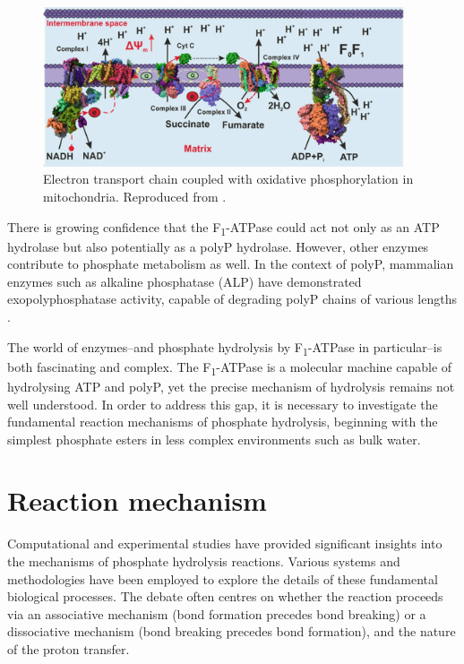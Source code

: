 \begin{figure}[t!]
    \centering
    \includegraphics[width=0.95\textwidth]{Figures/1_Introduction/intro_atp_synthase.pdf}
    \caption{Electron transport chain coupled with oxidative phosphorylation in mitochondria. Reproduced from \citep{baevInorganicPolyphosphateF0F1ATP2022}.}
    \label{fig:atp_synthase}
\end{figure}

There is growing confidence that the F\textsubscript{1}-ATPase could act not only as an ATP hydrolase but also potentially as a polyP hydrolase. However, other enzymes contribute to phosphate metabolism as well. In the context of polyP, mammalian enzymes such as alkaline phosphatase (ALP) have demonstrated exopolyphosphatase activity, capable of degrading polyP chains of various lengths \citep{baevInorganicPolyphosphateF0F1ATP2022}.

The world of enzymes--and phosphate hydrolysis by F\textsubscript{1}-ATPase in particular--is both fascinating and complex. The F\textsubscript{1}-ATPase is a molecular machine capable of hydrolysing ATP and polyP, yet the precise mechanism of hydrolysis remains not well understood. In order to address this gap, it is necessary to investigate the fundamental reaction mechanisms of phosphate hydrolysis, beginning with the simplest phosphate esters in less complex environments such as bulk water.



\section{Reaction mechanism}
Computational and experimental studies have provided significant insights into the mechanisms of phosphate hydrolysis reactions. Various systems and methodologies have been employed to explore the details of these fundamental biological processes. The debate often centres on whether the reaction proceeds via an associative mechanism (bond formation precedes bond breaking) or a dissociative mechanism (bond breaking precedes bond formation), and the nature of the proton transfer.



